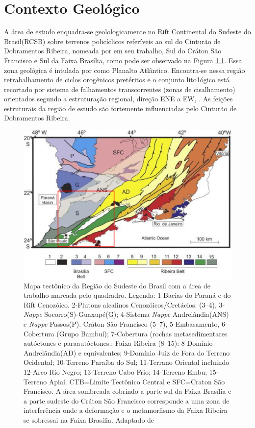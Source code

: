 \chapter{Contexto Geológico}

A área de estudo enquadra-se geolologicamente no Rift Continental do Sudeste do Brasil(RCSB) sobre terrenos policíclicos referíveis ao sul do Cinturão de Dobramentos Ribeira, nomeada por \cite{Riccomini_1989} em seu trabalho, Sul do Cráton São Francisco e Sul da Faixa Brasília, como pode ser observado na Figura \ref{mapa_geologico}. Essa zona geológica é intulada por \cite{Almeida_Carneiro_1998} como Planalto Atlântico. Encontra-se nessa região retrabalhamento de ciclos orogênicos pretéritos e o conjunto lito1ógico está recortado por sistema de falhamentos transcorrentes (zonas de cisalhamento) orientados segundo a estruturação regional, direção ENE a EW, \cite{Hasui_Sadowski_1976}. As feições estruturais da região de estudo são fortemente influenciadas pelo Cinturão de Dobramentos Ribeira.

\begin{figure}[!ht]
\centering
\includegraphics[scale=0.9]{mapa_geologico.png}
\caption[Mapa tectônico da Região do Sudeste do Brasil.]{Mapa tectônico da Região do Sudeste do Brasil com a área de trabalho marcada pelo quadradro. Legenda: 1-Bacias do Paraná e do Rift Cenozóico. 2-Plutons alcalinos Cenozóicos/Cretácios. (3–4), 3-\textit{Nappe} Socorro(S)-Guaxupé(G); 4-Sistema \textit{Nappe} Andrelândia(ANS) e \textit{Nappe} Passos(P). Cráton São Francisco (5–7), 5-Embasamento, 6-Cobertura (Grupo Bambuí); 7-Cobertura (rochas metasedimentares autóctones e paraautóctones.;  Faixa Ribeira (8–15): 8-Domínio Andrelândia(AD) e equivalentes; 9-Domínio Juiz de Fora do Terreno Ocidental; 10-Terreno Paraíba do Sul; 11-Terrano Oriental incluindo  12-Arco Rio Negro; 13-Terreno Cabo Frio; 14-Terreno Embu; 15-Terreno Apiaí. CTB=Limite Tectônico Central e SFC=Craton São Francisco. A área sombreada cobrindo a parte sul da Faixa Brasília e a parte sudeste do Cráton São Francisco corresponde a uma zona de interferência onde a deformação e o metamorfismo da Faixa Ribeira se  sobressai na Faixa Brasília. Adaptado de \cite{trouw_new_2013}}
\label{mapa_geologico}
\end{figure} 

